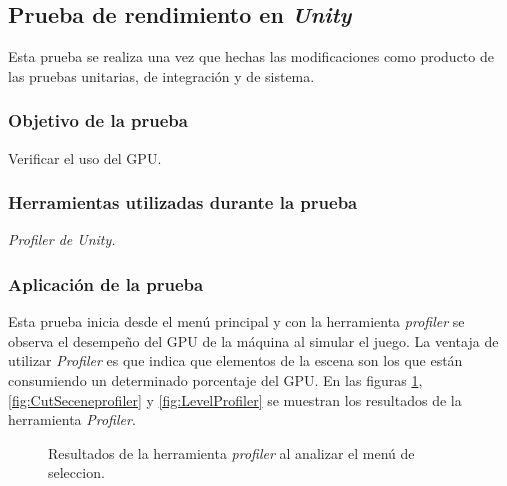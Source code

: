\subsection{Prueba de rendimiento en \textit{Unity}}
Esta prueba se realiza una vez que hechas las modificaciones como producto de las pruebas unitarias, de integración y de sistema.
\subsubsection{Objetivo de la prueba}
Verificar el uso del GPU.
\subsubsection{Herramientas utilizadas durante la prueba}
\textit{Profiler de Unity.}
\subsubsection{Aplicación de la prueba}
Esta prueba inicia desde el menú principal y con la herramienta \textit{profiler} se
observa el desempeño del GPU de la máquina al simular el juego. La ventaja de utilizar
\textit{Profiler} es que indica que elementos de la escena son los que están
consumiendo un determinado porcentaje del GPU. En las figuras
\ref{fig:MenuSelectionprofiler}, \ref{fig:CutSeceneprofiler} y
\ref{fig:LevelProfiler} se muestran los resultados de la
herramienta \textit{Profiler}.
\begin{figure}
  \centering
 
   
        
  \caption{Resultados de la herramienta \textit{profiler} al analizar el menú de        
  seleccion.}
  \label{fig:MenuSelectionprofiler}
\end{figure}

